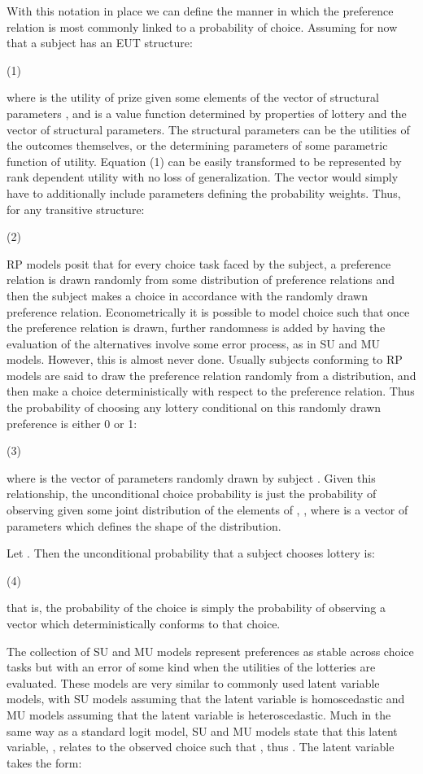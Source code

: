 \documentclass[../main.tex]{subfiles}
\begin{document}
With this notation in place we can define the manner in which the preference relation  is most commonly linked to a probability of choice.
Assuming for now that a subject has an EUT structure: 

		(1)

where  is the utility of prize  given some elements of the vector of structural parameters , and   is a value function determined by properties of lottery  and the vector of structural parameters.
The structural parameters  can be the utilities of the outcomes themselves, or the determining parameters of some parametric function of utility.
Equation (1) can be easily transformed to be represented by rank dependent utility with no loss of generalization.
The  vector would simply have to additionally include parameters defining the probability weights.
Thus, for any transitive structure:

		(2)

RP models posit that for every choice task faced by the subject, a preference relation is drawn randomly from some distribution of preference relations and then the subject makes a choice in accordance with the randomly drawn preference relation.
Econometrically it is possible to model choice such that once the preference relation is drawn, further randomness is added by having the evaluation of the alternatives involve some error process, as in SU and MU models.
However, this is almost never done.
Usually subjects conforming to RP models are said to draw the preference relation randomly from a distribution, and then make a choice deterministically with respect to the preference relation.
Thus the probability of choosing any lottery conditional on this randomly drawn preference is either 0 or 1:

		(3)

where  is the vector of parameters randomly drawn by subject .
Given this relationship, the unconditional choice probability is just the probability of observing  given some joint distribution of the elements of , , where  is a vector of parameters which defines the shape of the distribution.


Let .
Then the unconditional probability that a subject chooses lottery  is:

		(4)

that is, the probability of the choice is simply the probability of observing a  vector which deterministically conforms to that choice.


The collection of SU and MU models represent preferences as stable across choice tasks but with an error of some kind when the utilities of the lotteries are evaluated.
These models are very similar to commonly used latent variable models, with SU models assuming that the latent variable is homoscedastic and MU models assuming that the latent variable is heteroscedastic.
Much in the same way as a standard logit model, SU and MU models state that this latent variable, , relates to the observed choice such that , thus .
The latent variable takes the form:
\end{document}
